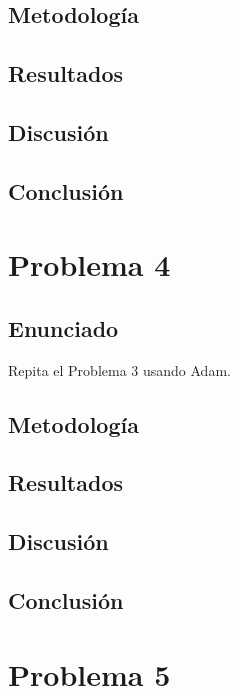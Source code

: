 \documentclass{article}
\begin{document}
\subsection{Metodología}

\subsection{Resultados}
\setcounter{equation}{0}

\subsection{Discusión}

\subsection{Conclusión}

\section{Problema 4}

\subsection{Enunciado}

Repita el Problema 3 usando Adam.

\subsection{Metodología}

\subsection{Resultados}
\setcounter{equation}{0}

\subsection{Discusión}

\subsection{Conclusión}

\section{Problema 5}
\end{document}
